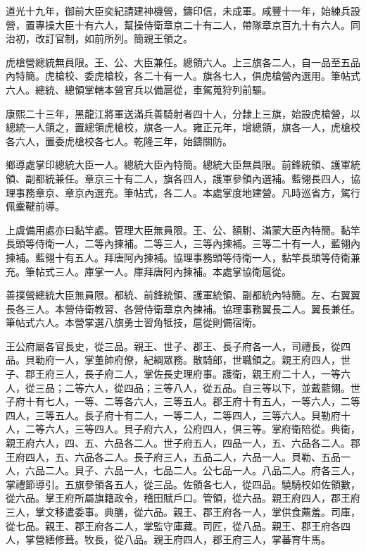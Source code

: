 \begin{pinyinscope}
道光十九年，御前大臣奕紀請建神機營，鑄印信，未成軍。咸豐十一年，始練兵設營，置專操大臣十有六人，幫操侍衛章京二十有二人，帶隊章京百九十有六人。同治初，改訂官制，如前所列。簡親王領之。

虎槍營總統無員限。王、公、大臣兼任。總領六人。上三旗各二人，自一品至五品內特簡。虎槍校、委虎槍校，各二十有一人。旗各七人，俱虎槍營內選用。筆帖式六人。總統、總領掌轄本營官兵以備扈從，車駕蒐狩列前驅。

康熙二十三年，黑龍江將軍送滿兵善騎射者四十人，分隸上三旗，始設虎槍營，以總統一人領之，置總領虎槍校，旗各一人。雍正元年，增總領，旗各一人，虎槍校各六人，置委虎槍校各七人。乾隆三年，始鑄關防。

鄉導處掌印總統大臣一人。總統大臣內特簡。總統大臣無員限。前鋒統領、護軍統領、副都統兼任。章京三十有二人，旗各四人，護軍參領內選補。藍翎長四人，協理事務章京、章京內選充。筆帖式，各二人。本處掌度地建營。凡時巡省方，駕行佩櫜鞬前導。

上虞備用處亦曰黏竿處。管理大臣無員限。王、公、額駙、滿蒙大臣內特簡。黏竿長頭等侍衛一人，二等內揀補。二等三人，三等內揀補。三等二十有一人，藍翎內揀補。藍翎十有五人。拜唐阿內揀補。協理事務頭等侍衛一人，黏竿長頭等侍衛兼充。筆帖式三人。庫掌一人。庫拜唐阿內揀補。本處掌協衛扈從。

善撲營總統大臣無員限。都統、前鋒統領、護軍統領、副都統內特簡。左、右翼翼長各三人。本營侍衛教習、各營侍衛章京內揀補。協理事務翼長二人。翼長兼任。筆帖式六人。本營掌選八旗勇士習角牴技，扈從則備宿衛。

王公府屬各官長史，從三品。親王、世子、郡王、長子府各一人，司禮長，從四品。貝勒府一人，掌董帥府僚，紀綱眾務。散騎郎，世職領之。親王府四人，世子、郡王府三人，長子府二人，掌佐長史理府事。護衛，親王府二十人，一等六人，從三品；二等六人，從四品；三等八人，從五品。自三等以下，並戴藍翎。世子府十有七人，一等、二等各六人，三等五人。郡王府十有五人，一等六人，二等四人，三等五人。長子府十有二人，一等二人，二等四人，三等六人。貝勒府十人，二等六人，三等四人。貝子府六人，公府四人，俱三等。掌府衛陪從。典衛，親王府六人，四、五、六品各二人。世子府五人，四品一人，五、六品各二人。郡王府四人，五、六品各二人。長子府三人，五品二人，六品一人。貝勒、五品一人，六品二人。貝子、六品一人，七品二人。公七品一人。八品二人。府各三人，掌禮節導引。五旗參領各五人，從三品。佐領各七人，從四品。驍騎校如佐領數，從六品。掌王府所屬旗籍政令，稽田賦戶口。管領，從六品。親王府四人，郡王府三人，掌文移遣委事。典膳，從六品。親王、郡王府各一人，掌供食薦羞。司庫，從七品。親王、郡王府各二人，掌監守庫藏。司匠，從八品。親王、郡王府各四人，掌營繕修葺。牧長，從八品。親王府四人，郡王府三人，掌蕃育牛馬。


\end{pinyinscope}
